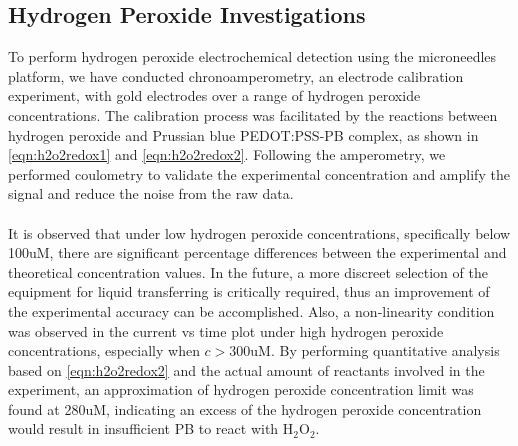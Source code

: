 \subsection{Hydrogen Peroxide Investigations}
To perform hydrogen peroxide electrochemical detection using the microneedles platform, we have conducted chronoamperometry, an electrode calibration experiment, with gold electrodes over a range of hydrogen peroxide concentrations. The calibration process was facilitated by the reactions between hydrogen peroxide and Prussian blue PEDOT:PSS-PB complex, as shown in \autoref{eqn:h2o2redox1} and \ref{eqn:h2o2redox2}. Following the amperometry, we performed coulometry to validate the experimental concentration and amplify the signal and reduce the noise from the raw data. \\\\It is observed that under low hydrogen peroxide concentrations, specifically below 100uM, there are significant percentage differences between the experimental and theoretical concentration values. In the future, a more discreet selection of the equipment for liquid transferring is critically required, thus an improvement of the experimental accuracy can be accomplished. Also, a non-linearity condition was observed in the current vs time plot under high hydrogen peroxide concentrations, especially when $c>300$uM. By performing quantitative analysis based on \autoref{eqn:h2o2redox2} and the actual amount of reactants involved in the experiment, an approximation of hydrogen peroxide concentration limit was found at 280uM, indicating an excess of the hydrogen peroxide concentration would result in insufficient PB to react with H$_{\text{2}}$O$_{\text{2}}$. 


